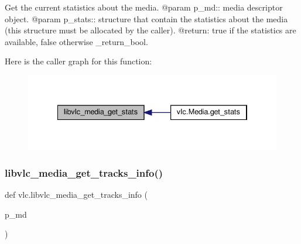 \begin{DoxyVerb}Get the current statistics about the media.
@param p_md:: media descriptor object.
@param p_stats:: structure that contain the statistics about the media (this structure must be allocated by the caller).
@return: true if the statistics are available, false otherwise \libvlc_return_bool.
\end{DoxyVerb}
 Here is the caller graph for this function\+:
\nopagebreak
\begin{figure}[H]
\begin{center}
\leavevmode
\includegraphics[width=334pt]{namespacevlc_a8bf54d145e8e2f4b0de4a3981be8fe66_icgraph}
\end{center}
\end{figure}
\mbox{\label{namespacevlc_ac5660b2bf617ac8dfd1ea85a31a42b66}} 
\subsubsection{\texorpdfstring{libvlc\+\_\+media\+\_\+get\+\_\+tracks\+\_\+info()}{libvlc\_media\_get\_tracks\_info()}}
{\footnotesize\ttfamily def vlc.\+libvlc\+\_\+media\+\_\+get\+\_\+tracks\+\_\+info (\begin{DoxyParamCaption}\item[{}]{p\+\_\+md }\end{DoxyParamCaption})}

